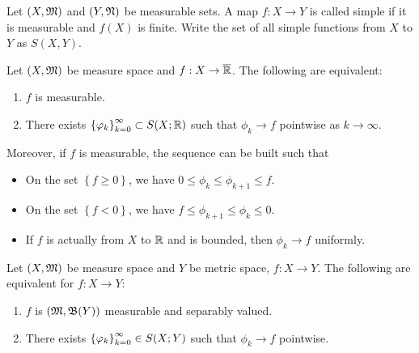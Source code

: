 \documentclass[a4paper]{article}
\begin{document}
\begin{defi}
  Let $(X, \mathfrak{M})$ and $(Y, \mathfrak{N})$ be measurable sets. A map 
  $f : X \to Y$ is called simple if it is 
  measurable and $f(X)$ is finite. Write the set of all 
  simple functions from $X$ to $Y$ as 
  $S(X, Y)$.
\end{defi}

\begin{thm}
  Let $(X, \mathfrak{M})$ be measure space and $f : X \to \overline{\mathbb{R}}$. The 
  following are equivalent: 
  \begin{enumerate}
    \item $f$ is measurable. 
    \item There exists $\left\{ \varphi_k \right\}_{k=0}^\infty \subset S(X; \mathbb{R})$ such that 
    $\phi_k \to f$ pointwise as $k \to \infty$.
  \end{enumerate}
  Moreover, if $f$ is measurable, the sequence can be built such that 
  \begin{itemize}
    \item On the set $\left\{ f \geq 0 \right\}$, we have 
    $0 \leq \phi_k \leq \phi_{k+1} \leq f$.
    \item On the set $\left\{ f < 0 \right\}$, we have 
    $f \leq \phi_{k+1} \leq \phi_k \leq 0$.
    \item If $f$ is actually from $X$ to $\mathbb{R}$ and is bounded, 
    then $\phi_k \to f$ uniformly.
  \end{itemize}
\end{thm}

\begin{thm}
  Let $(X, \mathfrak{M})$ be measure space and $Y$ be metric space, 
  $f : X \to Y$. The following are equivalent for 
  $f: X \to Y$: 
  \begin{enumerate}
    \item $f$ is $(\mathfrak{M}, \mathfrak{B}(Y))$ measurable and 
    separably valued.
    \item There exists $\left\{ \varphi_k \right\}_{k=0}^\infty \in S(X; Y)$
    such that $\phi_k \to f$ pointwise.
  \end{enumerate}
\end{thm}
\end{document}
